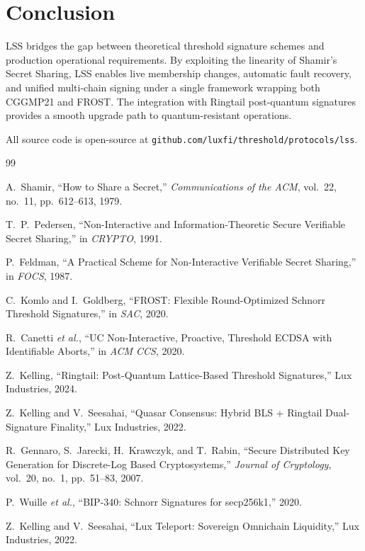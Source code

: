 \documentclass[11pt]{article}
\begin{document}
\section{Conclusion}

LSS bridges the gap between theoretical threshold signature schemes and production operational requirements. By exploiting the linearity of Shamir's Secret Sharing, LSS enables live membership changes, automatic fault recovery, and unified multi-chain signing under a single framework wrapping both CGGMP21 and FROST. The integration with Ringtail post-quantum signatures provides a smooth upgrade path to quantum-resistant operations.

All source code is open-source at \texttt{github.com/luxfi/threshold/protocols/lss}.

\begin{thebibliography}{99}

 A.~Shamir, ``How to Share a Secret,'' \emph{Communications of the ACM}, vol.~22, no.~11, pp.~612--613, 1979.

 T.~P.~Pedersen, ``Non-Interactive and Information-Theoretic Secure Verifiable Secret Sharing,'' in \emph{CRYPTO}, 1991.

 P.~Feldman, ``A Practical Scheme for Non-Interactive Verifiable Secret Sharing,'' in \emph{FOCS}, 1987.

 C.~Komlo and I.~Goldberg, ``FROST: Flexible Round-Optimized Schnorr Threshold Signatures,'' in \emph{SAC}, 2020.

 R.~Canetti \emph{et al.}, ``UC Non-Interactive, Proactive, Threshold ECDSA with Identifiable Aborts,'' in \emph{ACM CCS}, 2020.

 Z.~Kelling, ``Ringtail: Post-Quantum Lattice-Based Threshold Signatures,'' Lux Industries, 2024.

 Z.~Kelling and V.~Seesahai, ``Quasar Consensus: Hybrid BLS + Ringtail Dual-Signature Finality,'' Lux Industries, 2022.

 R.~Gennaro, S.~Jarecki, H.~Krawczyk, and T.~Rabin, ``Secure Distributed Key Generation for Discrete-Log Based Cryptosystems,'' \emph{Journal of Cryptology}, vol.~20, no.~1, pp.~51--83, 2007.

 P.~Wuille \emph{et al.}, ``BIP-340: Schnorr Signatures for secp256k1,'' 2020.

 Z.~Kelling and V.~Seesahai, ``Lux Teleport: Sovereign Omnichain Liquidity,'' Lux Industries, 2022.

\end{thebibliography}
\end{document}
